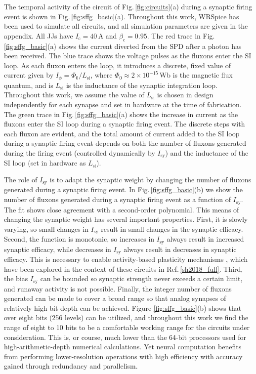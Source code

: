 \documentclass[twocolumn]{article}
\begin{document}
The temporal activity of the circuit of Fig.\,\ref{fig:circuits}(a) during a synaptic firing event is shown in Fig.\,\ref{fig:sffg_basic}(a). Throughout this work, WRSpice \cite{wh1991} has been used to simulate all circuits, and all simulation parameters are given in the appendix. All JJs have $I_{\mathrm{c}} = 40$\,\textmu A and $\beta_{\mathrm{c}} = 0.95$. The red trace in Fig.\,\ref{fig:sffg_basic}(a) shows the current diverted from the SPD after a photon has been received. The blue trace shows the voltage pulses as the fluxons enter the SI loop. As each fluxon enters the loop, it introduces a discrete, fixed value of current given by $I_{\phi} = \Phi_0/L_{\mathrm{si}}$, where $\Phi_0 \approx 2\times10^{-15}$\,Wb is the magnetic flux quantum, and is $L_{\mathrm{si}}$ is the inductance of the synaptic integration loop. Throughout this work, we assume the value of $L_{\mathrm{si}}$ is chosen in design independently for each synapse and set in hardware at the time of fabrication. The green trace in Fig.\,\ref{fig:sffg_basic}(a) shows the increase in current as the fluxons enter the SI loop during a synaptic firing event. The discrete steps with each fluxon are evident, and the total amount of current added to the SI loop during a synaptic firing event depends on both the number of fluxons generated during the firing event (controlled dynamically by $I_{\mathrm{sy}}$) and the inductance of the SI loop (set in hardware as $L_{\mathrm{si}}$). 

The role of $I_{\mathrm{sy}}$ is to adapt the synaptic weight by changing the number of fluxons generated during a synaptic firing event. In Fig.\,\ref{fig:sffg_basic}(b) we show the number of fluxons generated during a synaptic firing event as a function of $I_{\mathrm{sy}}$. The fit shows close agreement with a second-order polynomial. This means of changing the synaptic weight has several important properties. First, it is slowly varying, so small changes in $I_{\mathrm{sy}}$ result in small changes in the synaptic efficacy. Second, the function is monotonic, so increases in $I_{\mathrm{sy}}$ always result in increased synaptic efficacy, while decreases in $I_{\mathrm{sy}}$ always result in decreases in synaptic efficacy. This is necessary to enable activity-based plasticity mechanisms \cite{somi2000,mage2012}, which have been explored in the context of these circuits in Ref.\,\ref{sh2018_full}. Third, the bias $I_{\mathrm{sy}}$ can be bounded so synaptic strength never exceeds a certain limit, and runaway activity is not possible. Finally, the integer number of fluxons generated can be made to cover a broad range so that analog synapses of relatively high bit depth can be achieved. Figure \ref{fig:sffg_basic}(b) shows that over eight bits (256 levels) can be utilized, and throughout this work we find the range of eight to 10 bits to be a comfortable working range for the circuits under consideration. This is, or course, much lower than the 64-bit processors used for high-arithmetic-depth numerical calculations. Yet neural computation benefits from performing lower-resolution operations with high efficiency with accuracy gained through redundancy and parallelism. 
\end{document}
